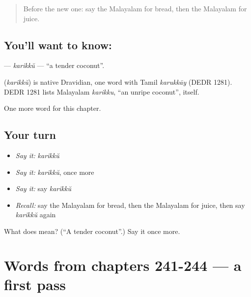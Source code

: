 \label{lesson:ML-C249-karikku}



\begin{quote}
Before the new one: say the Malayalam for bread, then the Malayalam for juice.
\end{quote}

\subsection*{You'll want to know: }
\textbf{} — \emph{karikkŭ} — \textquotedblleft{}a tender coconut\textquotedblright{}.

\begin{cousinweb}
\textbf{} (\emph{karikkŭ}) is native Dravidian, one word with Tamil \emph{karukkāy} (DEDR 1281). DEDR 1281 lists Malayalam \emph{karikku}, \textquotedblleft{}an unripe coconut\textquotedblright{}, itself.
\end{cousinweb}

\begin{grammarlens}[title={What you've built}]
One more word for this chapter.
\end{grammarlens}

\subsection*{Your turn}
\begin{itemize}
\raggedright
  \item \emph{Say it:} \emph{karikkŭ}
  \item \emph{Say it:} \emph{karikkŭ}, once more
  \item \emph{Say it:} say \emph{karikkŭ}
  \item \emph{Recall:} say the Malayalam for bread, then the Malayalam for juice, then say \emph{karikkŭ} again
\end{itemize}

\begin{tcolorbox}[breakable,colback=teal!4,colframe=teal!35!black,title={Before you move on}]
What does  mean? (\textquotedblleft{}A tender coconut\textquotedblright{}.) Say it once more.
\end{tcolorbox}
\section[(dialogue)]{Words from chapters 241-244 — a first pass}

\label{lesson:ML-R249-first-pass-words-from-chapters-241-244}



